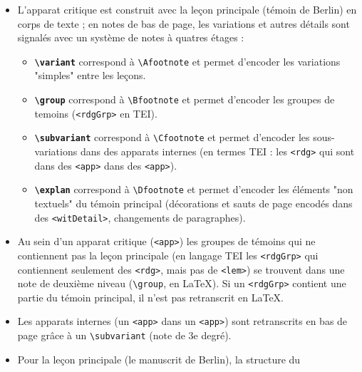 \documentclass[12pt, a4paper]{article}
\begin{document}
            \begin{itemize}
            	\item{L'apparat critique est construit avec la leçon principale (témoin de 
            		Berlin) en corps de texte ; en notes de bas de page, les variations et 
            		autres détails sont signalés avec un système de notes à quatres étages :}
            		\begin{itemize}
            			\item{\textbf{\texttt{\textbackslash variant}} correspond à \texttt{\textbackslash Afootnote} et 
            				permet d'encoder les variations "simples" entre les leçons.}
            			\item{\textbf{\texttt{\textbackslash group}} correspond à \texttt{\textbackslash Bfootnote} et 
            				permet d'encoder les groupes de temoins (\texttt{<rdgGrp>} 
            				en TEI).}
            			\item{\textbf{\texttt{\textbackslash subvariant}} correspond à \texttt{\textbackslash Cfootnote} 
            			et permet d'encoder les sous-variations dans des apparats internes 
            			(en termes TEI : les \texttt{<rdg>} qui sont dans des 
            			\texttt{<app>} dans des \texttt{<app>}).}
            			\item{\textbf{\texttt{\textbackslash explan}} correspond à \texttt{\textbackslash Dfootnote} et 
            				permet d'encoder les éléments "non textuels" du témoin principal 
            				(décorations et sauts de page encodés dans des \texttt{<witDetail>},
            				changements de paragraphes).}
            		\end{itemize}
            	\item{Au sein d'un apparat critique (\texttt{<app>}) les groupes de 
            		témoins qui ne contiennent pas la leçon principale (en langage TEI 
            		les \texttt{<rdgGrp>} qui contiennent seulement des 
            		\texttt{<rdg>}, mais pas de \texttt{<lem>}) se trouvent 
            		dans une note de deuxième niveau (\texttt{\textbackslash group}, en \LaTeX). Si un 
            		\texttt{<rdgGrp>} contient une partie du témoin principal, il n'est 
            		pas retranscrit en \LaTeX.}
            	\item{Les apparats internes (un \texttt{<app>} dans un 
            		\texttt{<app>}) sont retranscrits en bas de page grâce à un 
            		\texttt{\textbackslash subvariant} (note de 3e degré).}
            	\item{Pour la leçon principale (le manuscrit de Berlin), la structure du 
}
\end{itemize}
\end{document}
